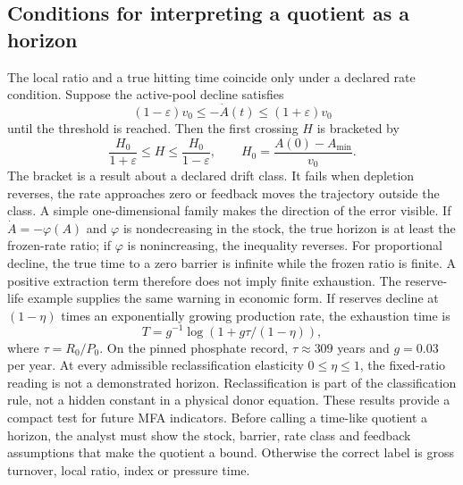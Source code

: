 \documentclass[11pt]{article}
\begin{document}
\subsection{Conditions for interpreting a quotient as a horizon}
The local ratio and a true hitting time coincide only under a declared rate condition. Suppose the active-pool decline satisfies
\[(1-\varepsilon)v_0\le -\dot A(t)\le(1+\varepsilon)v_0\]
until the threshold is reached. Then the first crossing \(H\) is bracketed by
\[\frac{H_0}{1+\varepsilon}\le H\le\frac{H_0}{1-\varepsilon},\qquad H_0=\frac{A(0)-A_{\min}}{v_0}.\]
The bracket is a result about a declared drift class. It fails when depletion reverses, the rate approaches zero or feedback moves the trajectory outside the class. A simple one-dimensional family makes the direction of the error visible. If \(\dot A=-\varphi(A)\) and \(\varphi\) is nondecreasing in the stock, the true horizon is at least the frozen-rate ratio; if \(\varphi\) is nonincreasing, the inequality reverses. For proportional decline, the true time to a zero barrier is infinite while the frozen ratio is finite. A positive extraction term therefore does not imply finite exhaustion.
The reserve-life example supplies the same warning in economic form. If reserves decline at \((1-\eta)\) times an exponentially growing production rate, the exhaustion time is
\[T=g^{-1}\log\left(1+g\tau/(1-\eta)\right),\]
where \(\tau=R_0/P_0\). On the pinned phosphate record, \(\tau\approx309\) years and \(g=0.03\) per year. At every admissible reclassification elasticity \(0\le\eta\le1\), the fixed-ratio reading is not a demonstrated horizon. Reclassification is part of the classification rule, not a hidden constant in a physical donor equation.
These results provide a compact test for future MFA indicators. Before calling a time-like quotient a horizon, the analyst must show the stock, barrier, rate class and feedback assumptions that make the quotient a bound. Otherwise the correct label is gross turnover, local ratio, index or pressure time.
\end{document}
